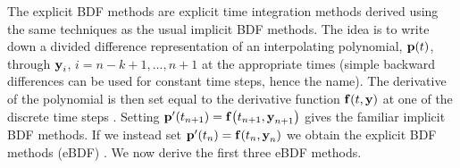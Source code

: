 The explicit BDF methods are explicit time integration methods derived using the same techniques as the usual implicit BDF methods.
The idea is to write down a divided difference representation of an interpolating polynomial, ${\boldsymbol{\mathrm{p}}}(t)$, through $\boldsymbol{\mathrm{y}}_i$, $i=n-k+1, \ldots, n+1$ at the appropriate times (simple backward differences can be used for constant time steps, hence the name).
The derivative of the polynomial is then set equal to the derivative function ${\boldsymbol{\mathrm{f}}{\left( t, \boldsymbol{\mathrm{y}} \right)}}$ at one of the discrete time steps \cite[400]{HairerNorsettWanner}.
Setting ${\boldsymbol{\mathrm{p}}}'(t_{n+1}) = {\boldsymbol{\mathrm{f}}{\left( t_{n+1}, \boldsymbol{\mathrm{y}}_{n+1} \right)}}$ gives the familiar implicit BDF methods.
If we instead set ${\boldsymbol{\mathrm{p}}}'(t_{n}) = {\boldsymbol{\mathrm{f}}{\left( t_{n}, \boldsymbol{\mathrm{y}}_{n} \right)}}$ we obtain the explicit BDF methods (eBDF) \cite[364]{HairerNorsettWanner}.
We now derive the first three eBDF methods.

